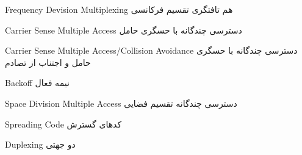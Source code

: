 %
%
%
%
%
%
%
%
%
%
%
%
%
%
%
%
%
%
%
%
%
%
%

{Frequency Devision Multiplexing}
{هم تافتگری تقسیم فرکانسی}{}


{Carrier Sense Multiple Access}
{دسترسی چندگانه با حسگری حامل}{}


{Carrier Sense Multiple Access/Collision Avoidance}
{دسترسی چندگانه با حسگری حامل و اجتناب از تصادم}{}


{Backoff}
{نیمه فعال}{}


{Space Division Multiple Access}
{دسترسی چندگانه تقسیم فضایی}{}


{Spreading Code} 
{کدهای گسترش}{}


%
%
%
%


%
%
%
%
%
%
%
%


{Duplexing}
{دو جهتی}{}


